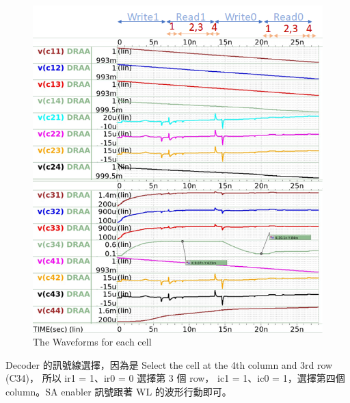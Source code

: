 \documentclass{article}
\begin{document}
\begin{enumerate}
  \begin{figure}[H]
  \centering
  \includegraphics[width = \linewidth]{./img/2023-12-24-17-15-46.png}
  \caption{The Waveforms for each cell}
  \end{figure}


    \clearpage

    Decoder 的訊號線選擇，因為是 Select the cell at the 4th column and 3rd row (C34)， 所以 ir1 = 1、ir0 = 0 選擇第 3 個 row， ic1 = 1、ic0 = 1，選擇第四個 column。SA enabler 訊號跟著 WL 的波形行動即可。


\end{enumerate}
\end{document}
